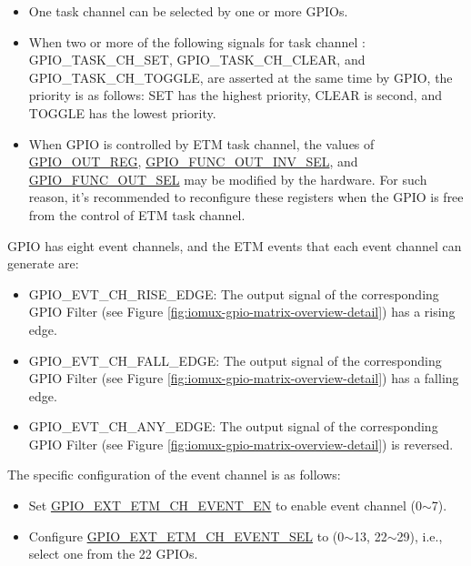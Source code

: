 \documentclass[main\_\_EN.tex]{subfiles}
\begin{document}
\begin{tiplisting}
\vspace{-2em}
\begin{itemize}
\item One task channel can be selected by one or more GPIOs.

\item When two or more of the following signals for task channel : GPIO\_TASK\_CH\_SET, GPIO\_TASK\_CH\_CLEAR, and GPIO\_TASK\_CH\_TOGGLE, are asserted at the same time by GPIO, the priority is as follows: SET has the highest priority, CLEAR is second, and TOGGLE has the lowest priority.

\item When GPIO is controlled by ETM task channel, the values of \hyperref[regdesc:GPIOOUTREG]{GPIO\_OUT\_REG}, \hyperref[fielddesc:GPIOFUNCNOUTINVSEL]{GPIO\_FUNC\_OUT\_INV\_SEL}, and \hyperref[fielddesc:GPIOFUNCNOUTSEL]{GPIO\_FUNC\_OUT\_SEL} may be modified by the hardware. For such reason, it's recommended to reconfigure these registers when the GPIO is free from the control of ETM task channel.
\end{itemize}
\end{tiplisting}

GPIO has eight event channels, and the ETM events that each event channel can generate are:

\begin{itemize}
    \item GPIO\_EVT\_CH\_RISE\_EDGE: The output signal of the corresponding GPIO Filter (see Figure \ref{fig:iomux-gpio-matrix-overview-detail}) has a rising edge.
    \item GPIO\_EVT\_CH\_FALL\_EDGE: The output signal of the corresponding GPIO Filter (see Figure \ref{fig:iomux-gpio-matrix-overview-detail}) has a falling edge.
    \item GPIO\_EVT\_CH\_ANY\_EDGE: The output signal of the corresponding GPIO Filter (see Figure \ref{fig:iomux-gpio-matrix-overview-detail}) is reversed.
\end{itemize}

The specific configuration of the event channel is as follows:

\begin{itemize}
    \item Set  \hyperref[fielddesc:GPIOEXTETMCHNEVENTEN]{GPIO\_EXT\_ETM\_CH\_EVENT\_EN} to enable event channel  (0$\sim$7).
    \item Configure \hyperref[fielddesc:GPIOEXTETMCHNEVENTSEL]{GPIO\_EXT\_ETM\_CH\_EVENT\_SEL} to  (0$\sim$13, 22$\sim$29), i.e., select one from the 22 GPIOs.
\end{itemize}
\end{document}
